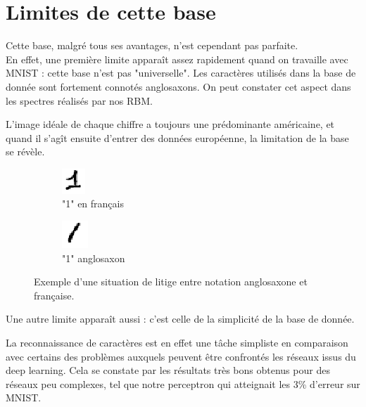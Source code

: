 \documentclass[a4paper,oneside]{report}
\begin{document}
            \section{Limites de cette base}

                Cette base, malgré tous ses avantages, n'est cependant pas parfaite.\\

                En effet, une première limite apparaît assez rapidement quand on travaille avec MNIST 
: cette base n'est pas "universelle". Les caractères utilisés dans la base de donnée 
sont fortement connotés 
anglosaxons. On peut constater cet aspect dans les spectres réalisés par nos RBM.

                L'image idéale de chaque chiffre a toujours une prédominante américaine, et quand il 
s'agît ensuite d'entrer des données européenne, la limitation de la base se révèle.\\

                \begin{figure}
                    \centering
                    \begin{subfigure}[b]{0.3\textwidth}
                        \centering
                        \includegraphics{Images/mnist-02.png}
                        \caption{"1" en français}
                    \end{subfigure}
                    \hfill
                    \begin{subfigure}[b]{0.3\textwidth}
                        \centering
                        \includegraphics{Images/mnist-03.png}
                        \caption{"1" anglosaxon}
                    \end{subfigure}
                    \caption{Exemple d'une situation de litige entre notation anglosaxone et française.}
                \end{figure}

                Une autre limite apparaît aussi : c'est celle de la simplicité de la base de donnée.

                La reconnaissance de caractères est en effet une tâche simpliste en comparaison avec 
certains des problèmes auxquels peuvent être confrontés les réseaux issus du deep 
learning. Cela se constate par 
les résultats très bons obtenus pour des réseaux peu complexes, tel que notre perceptron qui 
atteignait les 3\% d'erreur sur MNIST.
\end{document}
